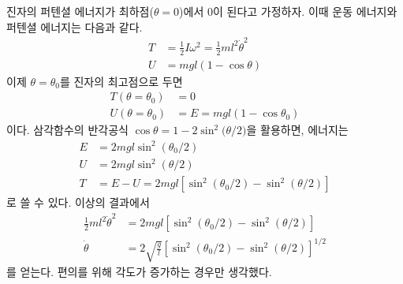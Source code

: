 \documentclass[chapter, oneside, b5paper]{oblivoir}
\theoremstyle{plain}
\theoremstyle{definition}
\theoremstyle{remark}
\begin{document}
진자의 퍼텐셜 에너지가 최하점($\theta = 0$)에서 $0$이 된다고 가정하자. 이때 운동 에너지와 퍼텐셜 에너지는 다음과 같다.
\begin{equation}
    \begin{aligned}
        T &= \frac{1}{2}I\omega^2 = \frac{1}{2}ml^2\dot{\theta}^2 \\
        U &= mgl(1-\cos{\theta})
    \end{aligned}
\end{equation}
이제 $\theta = \theta_0$를 진자의 최고점으로 두면
\begin{equation}
    \begin{aligned}
        T(\theta=\theta_0) &= 0 \\
        U(\theta=\theta_0) &= E = mgl(1-\cos{\theta_0})
    \end{aligned}
\end{equation}
이다. 삼각함수의 반각공식 $\cos{\theta}=1-2\sin^2{(\theta / 2})$을 활용하면, 에너지는
\begin{equation}
    \begin{aligned}
        E &= 2mgl \sin^2{(\theta_0/ 2)}\\
        U &= 2mgl \sin^2{(\theta / 2)} \\
        T &= E-U = 2mgl [\sin^2{(\theta_0/2)} - \sin^2{(\theta / 2)}]
    \end{aligned}
    \label{eq:3.7}
\end{equation}
로 쓸 수 있다. 이상의 결과에서
\begin{equation}
    \begin{aligned}
        \frac{1}{2}ml^2\dot{\theta}^2 &= 2mgl [\sin^2{(\theta_0/2)} - \sin^2{(\theta / 2)}] \\
        \dot{\theta} &= 2 \sqrt{\frac{g}{l}}[\sin^2{(\theta_0/2)} - \sin^2{(\theta / 2)}]^{1/2}
    \end{aligned}
    \label{eq:3.8}
\end{equation}
를 얻는다. 편의를 위해 각도가 증가하는 경우만 생각했다.
\end{document}
